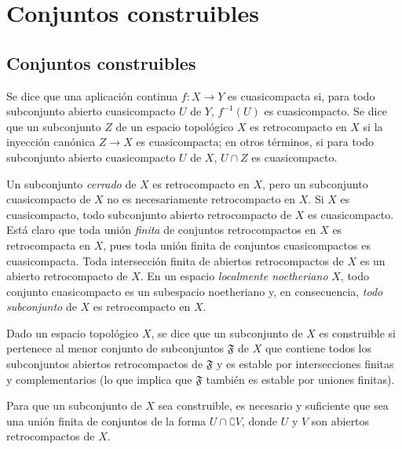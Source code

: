 \section{Conjuntos construibles}
\label{section:0.9}
\label{section:0.9-fr}

\subsection{Conjuntos construibles}
\label{subsection:0.9.1}
\label{subsection:0.9.1-fr}

\begin{definition}[9.1.1]
\label{0.9.1.1}
\label{0.9.1.1-fr}
Se dice que una aplicación continua $f:X\to Y$ es cuasicompacta si, para todo subconjunto abierto cuasicompacto $U$ de $Y$, $f^{-1}(U)$ es cuasicompacto.
Se dice que un subconjunto $Z$ de un espacio topológico $X$ es retrocompacto en $X$ si la inyección canónica $Z\to X$ es cuasicompacta; en otros términos, si para todo subconjunto abierto cuasicompacto $U$ de $X$, $U\cap Z$ es cuasicompacto.
\end{definition}

Un subconjunto \emph{cerrado} de $X$ es retrocompacto en $X$, pero un subconjunto cuasicompacto de $X$ no es necesariamente retrocompacto en $X$.
Si $X$ es cuasicompacto, todo subconjunto abierto retrocompacto de $X$ es cuasicompacto.
Está claro que toda unión \emph{finita} de conjuntos retrocompactos en $X$ es retrocompacta en $X$, pues toda unión finita de conjuntos cuasicompactos es cuasicompacta.
Toda intersección finita de abiertos retrocompactos de $X$ es un abierto retrocompacto de $X$.
En un espacio \emph{localmente noetheriano} $X$, todo conjunto cuasicompacto es un subespacio noetheriano y, en consecuencia, \emph{todo subconjunto} de $X$ es retrocompacto en $X$.

\begin{definition}[9.1.2]
\label{0.9.1.2}
\label{0.9.1.2-fr}
Dado un espacio topológico $X$, se dice que un subconjunto de $X$ es construible si pertenece al menor conjunto de subconjuntos $\mathfrak{F}$ de $X$ que contiene todos los subconjuntos abiertos retrocompactos de $\mathfrak{F}$ y es estable por intersecciones finitas y complementarios \textup{(lo que implica que $\mathfrak{F}$ también es} estable por uniones finitas\textup{)}.
\end{definition}

\begin{proposition}[9.1.3]
\label{0.9.1.3}
\label{0.9.1.3-fr}
Para que un subconjunto de $X$ sea construible, es necesario y suficiente que sea una unión finita de conjuntos de la forma $U\cap\complement{V}$, donde $U$ y $V$ son abiertos retrocompactos de $X$.
\end{proposition}


